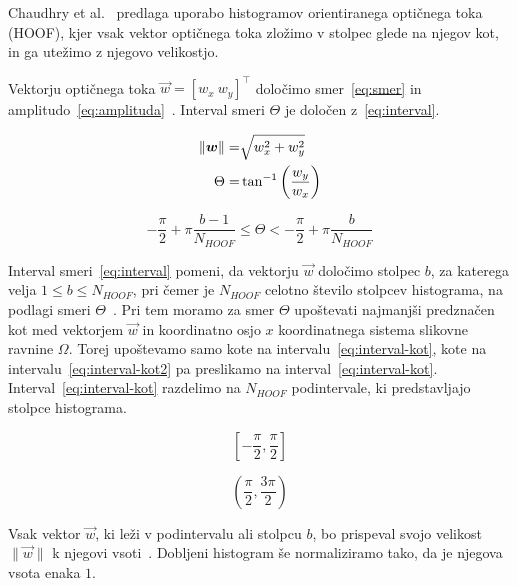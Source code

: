 Chaudhry et al.~\cite{chaudhry2009histograms} predlaga uporabo histogramov orientiranega optičnega toka (HOOF), kjer vsak vektor optičnega toka zložimo v stolpec glede na njegov kot, in ga utežimo z njegovo velikostjo.

Vektorju optičnega toka $\vec{w} = [w_x~w_y]^\top$ določimo smer~\eqref{eq:smer} in amplitudo~\eqref{eq:amplituda}~\cite{chaudhry2009histograms}. Interval smeri $\Theta$ je določen z~\eqref{eq:interval}. 

\begin{align}
    \left\lVert {\boldsymbol{w}} \right\rVert = & \sqrt{w_x^2 + w_y^2} \label{eq:amplituda} \\
    \Theta = & \tan^{-1}\left( \frac{w_y}{w_x} \right) \label{eq:smer}
\end{align}


\begin{equation}\label{eq:interval}
	-\frac{\pi}{2} + \pi \frac{b - 1}{N_{HOOF}} \leq \Theta < - \frac{\pi}{2} + \pi \frac{b}{N_{HOOF}}
\end{equation}


Interval smeri~\eqref{eq:interval} pomeni, da vektorju $\vec{w}$ določimo stolpec $b$, za katerega velja $1 \leq b \leq N_{HOOF}$, pri čemer je $N_{HOOF}$ celotno število stolpcev histograma, na podlagi smeri $\Theta$~\cite{chaudhry2009histograms}. Pri tem moramo za smer $\Theta$ upoštevati najmanjši predznačen kot med vektorjem $\vec{w}$ in koordinatno osjo $x$ koordinatnega sistema slikovne ravnine $\varOmega$. Torej upoštevamo samo kote na intervalu~\eqref{eq:interval-kot}, kote na intervalu~\eqref{eq:interval-kot2} pa preslikamo na interval~\eqref{eq:interval-kot}. Interval~\eqref{eq:interval-kot} razdelimo na $N_{HOOF}$ podintervale, ki predstavljajo stolpce histograma. 

\begin{equation}\label{eq:interval-kot}
	\left[-\frac{\pi}{2}, \frac{\pi}{2}\right]
\end{equation}

\begin{equation}\label{eq:interval-kot2}
	\left(\frac{\pi}{2},\frac{3\pi}{2}\right)
\end{equation}

Vsak vektor $\vec{w}$, ki leži v podintervalu ali stolpcu $b$, bo prispeval svojo velikost $\|\vec{w} \|$ k njegovi vsoti~\cite{chaudhry2009histograms}. Dobljeni histogram še normaliziramo tako, da je njegova vsota enaka $1$.





